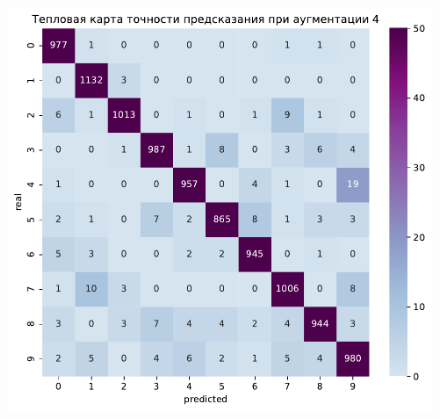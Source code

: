 \documentclass{article}
\begin{document}
\begin{figure}[h]
{\begin{minipage}{8cm}
		\end{minipage}
		\label{app:violet3}
	}
	\subfigure
	{
        \begin{minipage}{8cm}
            \centering
            \includegraphics[scale=0.35]{TASK1 warm map 4.pdf}
		\end{minipage}
		\label{app:violet4}
	}
	\captionsetup{labelformat=empty, labelsep=none}
	\caption{ }
\end{figure}
\end{document}
